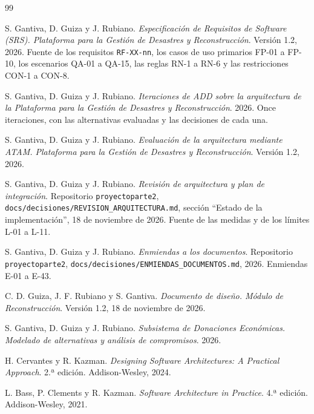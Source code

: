\documentclass[11pt,letterpaper]{article}
\providecommand{\br}{\discretionary{}{}{}}
\begin{document}
\begingroup
\renewcommand{\section}[2]{}
\begin{thebibliography}{99}

S. Gantiva, D. Guiza y J. Rubiano. \textit{Especificación de Requisitos de Software (SRS).
Plataforma para la Gestión de Desastres y Reconstrucción}. Versión 1.2, 2026. Fuente de los
requisitos \texttt{RF-XX-nn}, los casos de uso primarios FP-01 a FP-10, los escenarios QA-01 a
QA-15, las reglas RN-1 a RN-6 y las restricciones CON-1 a CON-8.

S. Gantiva, D. Guiza y J. Rubiano. \textit{Iteraciones de ADD sobre la arquitectura de la
Plataforma para la Gestión de Desastres y Reconstrucción}. 2026. Once iteraciones, con las
alternativas evaluadas y las decisiones de cada una.

S. Gantiva, D. Guiza y J. Rubiano. \textit{Evaluación de la arquitectura mediante ATAM. Plataforma
para la Gestión de Desastres y Reconstrucción}. Versión 1.2, 2026.

S. Gantiva, D. Guiza y J. Rubiano. \textit{Revisión de arquitectura y plan de integración}.
Repositorio \texttt{proyectoparte2}, \texttt{docs/\br{}decisiones/\br{}REVISION\_\br{}ARQUITECTURA.\br{}md}, sección
\enquote{Estado de la implementación}, 18 de noviembre de 2026. Fuente de las medidas y de los
límites L-01 a L-11.

S. Gantiva, D. Guiza y J. Rubiano. \textit{Enmiendas a los documentos}. Repositorio
\texttt{proyectoparte2}, \texttt{docs/\br{}decisiones/\br{}ENMIENDAS\_\br{}DOCUMENTOS.\br{}md}, 2026. Enmiendas E-01 a
E-43.

C. D. Guiza, J. F. Rubiano y S. Gantiva. \textit{Documento de diseño. Módulo de Reconstrucción}.
Versión 1.2, 18 de noviembre de 2026.

S. Gantiva, D. Guiza y J. Rubiano. \textit{Subsistema de Donaciones Económicas. Modelado de
alternativas y análisis de compromisos}. 2026.

H. Cervantes y R. Kazman. \textit{Designing Software Architectures: A Practical Approach}. 2.ª
edición. Addison-Wesley, 2024.

L. Bass, P. Clements y R. Kazman. \textit{Software Architecture in Practice}. 4.ª edición.
Addison-Wesley, 2021.


\end{thebibliography}
\end{document}

